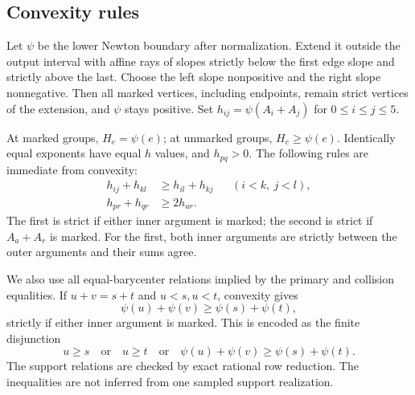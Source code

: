 \documentclass[11pt]{article}
\theoremstyle{remark}\newtheorem{remark}[theorem]{Remark}
\begin{document}
\subsection{Convexity rules}

Let $\psi$ be the lower Newton boundary after normalization. Extend
it outside the output interval with affine rays of slopes strictly
below the first edge slope and strictly above the last. Choose the
left slope nonpositive and the right slope nonnegative. Then all
marked vertices, including endpoints, remain strict vertices of the
extension, and $\psi$ stays positive. Set
$h_{ij}=\psi(A_i+A_j)$ for $0\le i\le j\le5$.

At marked groups, $H_e=\psi(e)$; at unmarked groups, $H_e\ge\psi(e)$.
Identically equal exponents have equal $h$ values, and $h_{pq}>0$.
The following rules are immediate from convexity:
\begin{align}
 h_{ij}+h_{kl}&\ge h_{il}+h_{kj} &&(i<k,\ j<l),\label{eq:monge}\\
 h_{pr}+h_{qr}&\ge2h_{ar}.\label{eq:midpoint}
\end{align}
The first is strict if either inner argument is marked; the second
is strict if $A_a+A_r$ is marked. For the first, both inner arguments
are strictly between the outer arguments and their sums agree.

We also use all equal-barycenter relations implied by the primary and
collision equalities. If $u+v=s+t$ and $u<s,u<t$, convexity gives
\begin{equation}\label{eq:barycenter}
 \psi(u)+\psi(v)\ge\psi(s)+\psi(t),
\end{equation}
strictly if either inner argument is marked. This is encoded as the
finite disjunction
\[
 u\ge s\quad\text{or}\quad u\ge t\quad\text{or}\quad
 \psi(u)+\psi(v)\ge\psi(s)+\psi(t).
\]
The support relations are checked by exact rational row reduction.
The inequalities are not inferred from one sampled support realization.
\end{document}
